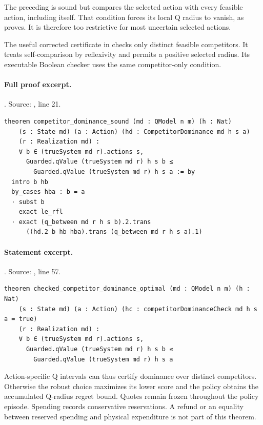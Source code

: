 \documentclass[11pt]{article}
\begin{document}
The preceding  is sound but compares the selected
action with every feasible action, including itself. That condition forces
its local Q radius to vanish, as
 proves. It is
therefore too restrictive for most uncertain selected actions.

The useful corrected certificate in  checks only
distinct feasible competitors. It treats self-comparison by reflexivity and
permits a positive selected radius. Its executable Boolean checker uses the
same competitor-only condition.

\paragraph{Full proof excerpt.}. Source: , line 21.
\begin{lstlisting}[style=AVOCSource]
theorem competitor_dominance_sound (md : QModel n m) (h : Nat)
    (s : State md) (a : Action) (hd : CompetitorDominance md h s a)
    (r : Realization md) :
    ∀ b ∈ (trueSystem md r).actions s,
      Guarded.qValue (trueSystem md r) h s b ≤
        Guarded.qValue (trueSystem md r) h s a := by
  intro b hb
  by_cases hba : b = a
  · subst b
    exact le_rfl
  · exact (q_between md r h s b).2.trans
      ((hd.2 b hb hba).trans (q_between md r h s a).1)
\end{lstlisting}

\paragraph{Statement excerpt.}. Source: , line 57.
\begin{lstlisting}[style=AVOCSource]
theorem checked_competitor_dominance_optimal (md : QModel n m) (h : Nat)
    (s : State md) (a : Action) (hc : competitorDominanceCheck md h s a = true)
    (r : Realization md) :
    ∀ b ∈ (trueSystem md r).actions s,
      Guarded.qValue (trueSystem md r) h s b ≤
        Guarded.qValue (trueSystem md r) h s a
\end{lstlisting}


Action-specific Q intervals can thus certify dominance over distinct
competitors. Otherwise the robust choice maximizes its lower score and the policy obtains the
accumulated Q-radius regret bound. Quotes remain frozen throughout the policy
episode. Spending records conservative reservations. A refund or an equality
between reserved spending and physical expenditure is not part of this
theorem.
\end{document}
